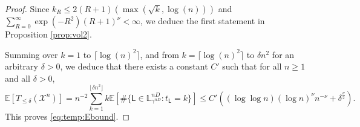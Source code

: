 \documentclass[10pt,a4paper]{amsart}
\begin{document}
\begin{proof}
    Since $k_R\leq 2 (R+1)(\max(\sqrt{k},\log(n) ))$ and $\sum_{R=0}^\infty   \exp(-R^2) (R+1)^\nu<\infty$, we deduce the first statement in Proposition \ref{prop:vol2}.
    
    Summing over $k=1$ to $\lceil \log(n)^2 \rceil$, and from $k=\lceil \log(n)^2 \rceil$ to $\delta n^2$ for an arbitrary $\delta>0$,
    we deduce that there exists a constant $C'$ such that for all $n\geq 1$ and all $\delta>0$,
    \[
    \mathbb{E}[T_{\leq \delta}(\mathcal{X}^n)]
    =n^{-2}
    \sum_{k=1}^{\lfloor \delta n^2 \rfloor}  k \mathbb{E}[\# \{  \mathsf{L}\in \mathbb{L}^{nD}_{\gamma^{nD}}: t_{\mathsf{L}}=k  \}]
    \leq C' ((\log\log n) (\log n)^\nu n^{-\nu}+ \delta^{\frac{\nu}{2}}).
    \]
    This proves \eqref{eq:temp:Ebound}.
\end{proof}
\end{document}
